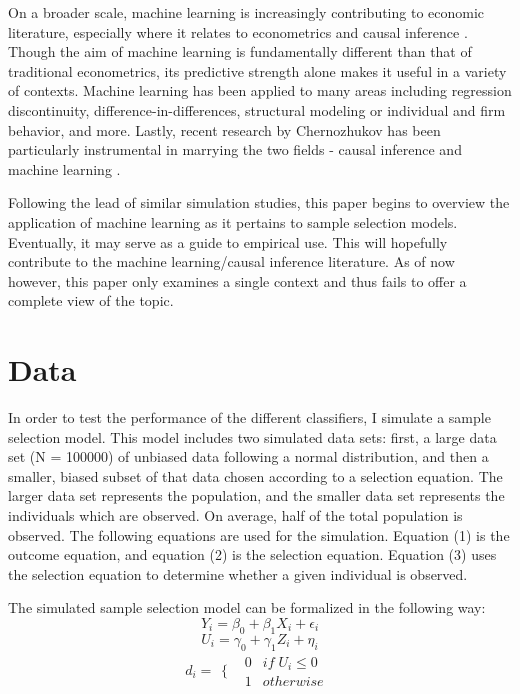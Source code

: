 \documentclass[12pt,english]{article}
\begin{document}
\par
On a broader scale, machine learning is increasingly contributing to economic literature, especially where it relates to econometrics and causal inference \cite{athey_2018}. Though the aim of machine learning is fundamentally different than that of traditional econometrics, its predictive strength alone makes it useful in a variety of contexts. Machine learning has been applied to many areas including regression discontinuity, difference-in-differences, structural modeling or individual and firm behavior, and more. Lastly, recent research by Chernozhukov has been particularly instrumental in marrying the two fields - causal inference and machine learning \cite{newey_hansen_duflo_robins_chernozhukov_demirer_chetverikov_2017}.
\par
Following the lead of similar simulation studies, this paper begins to overview the application of machine learning as it pertains to sample selection models. Eventually, it may serve as a guide to empirical use. This will hopefully contribute to the machine learning/causal inference literature. As of now however, this paper only examines a single context and thus fails to offer a complete view of the topic.
\section{Data}

In order to test the performance of the different classifiers, I simulate a sample selection model. This model includes two simulated data sets: first, a large data set (N = 100000) of unbiased data following a normal distribution, and then a smaller, biased subset of that data chosen according to a selection equation. The larger data set represents the population, and the smaller data set represents the individuals which are observed. On average, half of the total population is observed. The following equations are used for the simulation. Equation (1) is the outcome equation, and equation (2) is the selection equation. Equation (3) uses the selection equation to determine whether a given individual is observed.

The simulated sample selection model can be formalized in the following way:
\begin{equation}
Y_i = \beta_0 + \beta_1 X_i + \epsilon_i
\end{equation}
\begin{equation}
U_i = \gamma_0 + \gamma_1 Z_i + \eta_i
\end{equation}
\begin{equation}
d_i =
\begin{array}{cc}
  \{ &
    \begin{array}{cc}
      0 & if \; U_i\leq 0 \\
      1 & otherwise
    \end{array}
\end{array}
\end{equation}
\end{document}
